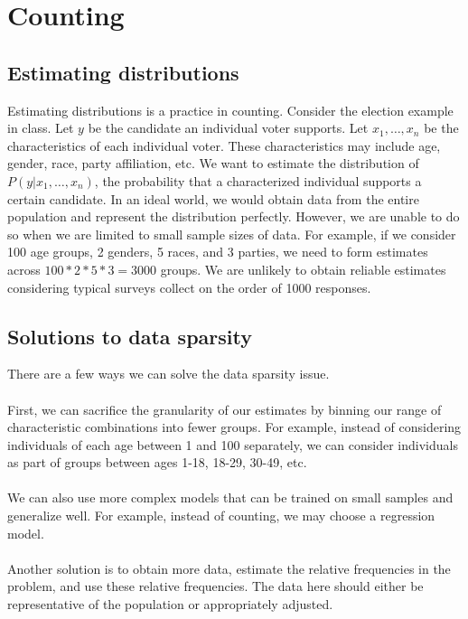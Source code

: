 \section{Counting}
\subsection{Estimating distributions}
Estimating distributions is a practice in counting. Consider the election example in class. Let $y$ be the candidate an individual voter supports. Let $x_1, \ldots, x_n$ be the characteristics of each individual voter. These characteristics may include age, gender, race, party affiliation, etc. We want to estimate the distribution of $P(y | x_1, \ldots, x_n)$, the probability that a characterized individual supports a certain candidate. In an ideal world, we would obtain data from the entire population and represent the distribution perfectly. However, we are unable to do so when we are limited to small sample sizes of data. For example, if we consider 100 age groups, 2 genders, 5 races, and 3 parties, we need to form estimates across $100 * 2 * 5 * 3 = 3000$ groups. We are unlikely to obtain reliable estimates considering typical surveys collect on the order of 1000 responses.

\subsection{Solutions to data sparsity}
There are a few ways we can solve the data sparsity issue.\\\\
First, we can sacrifice the granularity of our estimates by binning our range of characteristic combinations into fewer groups. For example, instead of considering individuals of each age between 1 and 100 separately, we can consider individuals as part of groups between ages 1-18, 18-29, 30-49, etc.\\\\
We can also use more complex models that can be trained on small samples and generalize well. For example, instead of counting, we may choose a regression model.\\\\
Another solution is to obtain more data, estimate the relative frequencies in the problem, and use these relative frequencies. The data here should either be representative of the population or appropriately adjusted.

